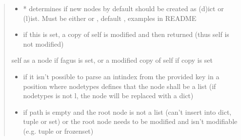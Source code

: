 \documentclass[a4paper,10pt,english]{sphinxmanual}
\begin{document}
\begin{fulllineitems}
\begin{fulllineitems}
\begin{quote}
\begin{description}
\begin{itemize}
\item {}
\sphinxAtStartPar
{} \textendash{} * determines if new nodes by default should be created as (d)ict or (l)ist. Must be
either  or , default , examples in README

\item {}
\sphinxAtStartPar
{} \textendash{} if this is set, a copy of self is modified and then returned (thus self is not modified)

\end{itemize}

\sphinxAtStartPar
self as a node if fagus is set, or a modified copy of self if copy is set

\begin{itemize}
\item {}
\sphinxAtStartPar
{} \textendash{} if it isn’t possible to parse an int\sphinxhyphen{}index from the provided key in a position where node\sphinxhyphen{}types
    defines that the node shall be a list (if node\sphinxhyphen{}types is not l, the node will be replaced with a dict)

\item {}
\sphinxAtStartPar
{} \textendash{} if path is empty and the root node is not a list (can’t insert into dict, tuple or set) or the
    root node needs to be modified and isn’t modifiable (e.g. tuple or frozenset)

\end{itemize}

\end{description}\end{quote}

\end{fulllineitems}



\end{fulllineitems}
\end{document}
